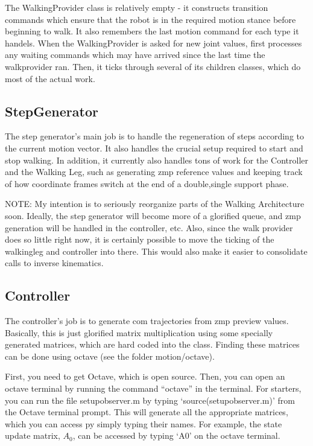 \documentclass[11pt]{article}
\begin{document}
The WalkingProvider class is relatively empty - it constructs transition
commands which ensure that the robot is in the required motion stance before
beginning to walk. It also remembers the last motion command for each type
it handels.  When the WalkingProvider is asked for new joint values,
first processes any waiting commands which may have arrived since the last
time the walkprovider ran.  Then, it ticks through several of its children
classes, which do most of the actual work.

\subsection{StepGenerator}
The step generator's main job is to handle the regeneration of steps according
to the current motion vector. It also handles the crucial setup required to
start and stop walking.  In addition, it currently also handles tons of work
for the Controller and the Walking Leg, such as generating zmp reference values
and keeping track of how coordinate frames switch at the end of a double,single
support phase.

NOTE: My intention is to seriously reorganize parts of the Walking Architecture
soon.  Ideally, the step generator will become more of a glorified queue, and
zmp generation will be handled in the controller, etc. Also, since the walk
provider does so little right now, it is certainly possible to move the ticking
of the walkingleg and controller into there. This would also make it easier
to consolidate calls to inverse kinematics.

\subsection{Controller}
The controller's job is to generate com trajectories from zmp preview values.
Basically, this is just glorified matrix multiplication using some specially
generated matrices, which are hard coded into the class. Finding these
matrices can be done using octave (see the folder motion/octave).

First, you need to get Octave, which is open source. Then, you can open an
octave terminal by running the command ``octave'' in the terminal.
For starters, you can run the file setupobserver.m by typing
`source(setupobserver.m)' from the Octave terminal prompt.
This will generate all the appropriate
matrices, which you can access py simply typing their names. For example, the
state update matrix, $A_0$, can be accessed by typing `A0' on the octave
terminal.
\end{document}
